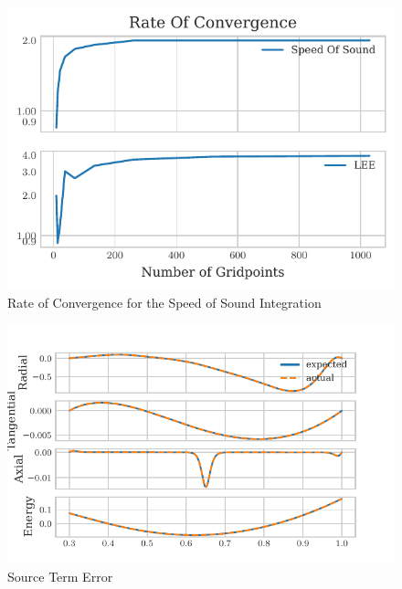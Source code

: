 \documentclass{article}
\begin{document}
 \begin{figure}
     \centering
         \includegraphics{tex-outputs/ROC.pdf}
     \caption{Rate of Convergence for the Speed of Sound Integration}
 \end{figure}

 \begin{figure}
         \includegraphics{tex-outputs/SourceTermData.pdf}
     \caption{Source Term Error}
 \end{figure}
\end{document}
